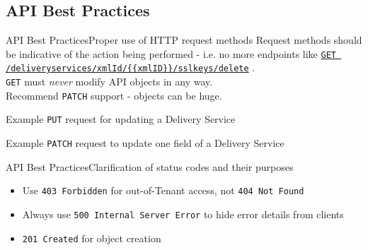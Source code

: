 \documentclass[10pt]{beamer}
\newcommand{\code}[1]{\texorpdfstring{\texttt{\color{inlinecodecolor}#1}}{#1}}
\newcommand{\chref}[2]{
	\href{#1}{{\usebeamercolor[bg]{Feather}#2}}
}
\begin{document}
\subsection{API Best Practices}
\begin{frame}{API Best Practices}{Proper use of HTTP request methods}
	Request methods should be indicative of the action being performed - i.e. no
	more endpoints like \chref{https://traffic-control-cdn.readthedocs.io/en/latest/api/v1/deliveryservices\_xmlid\_xmlid\_sslkeys\_delete.html}{\code{GET /deliveryservices/xmlId/\{\{xmlID\}\}/sslkeys/delete}}.\\
	\code{GET} must \emph{never} modify API objects in any way.\\
	Recommend \code{PATCH} support - objects can be huge.
	\begin{overprint}
		\begin{block}{Example \code{PUT} request for updating a Delivery Service}
			\exampleDSFullPost{}
		\end{block}
		\begin{block}{Example \code{PATCH} request to update one field of a Delivery Service}
			\exampleDSPatch{}
		\end{block}
	\end{overprint}
\end{frame}

\begin{frame}{API Best Practices}{Clarification of status codes and their purposes}
	\begin{itemize}
		\item<1-> Use \code{403 Forbidden} for out-of-Tenant access, not \code{404 Not Found}
		\item<2-> Always use \code{500 Internal Server Error} to hide error details from clients
		\item<3-> \code{201 Created} for object creation
	\end{itemize}
\end{frame}
\end{document}
